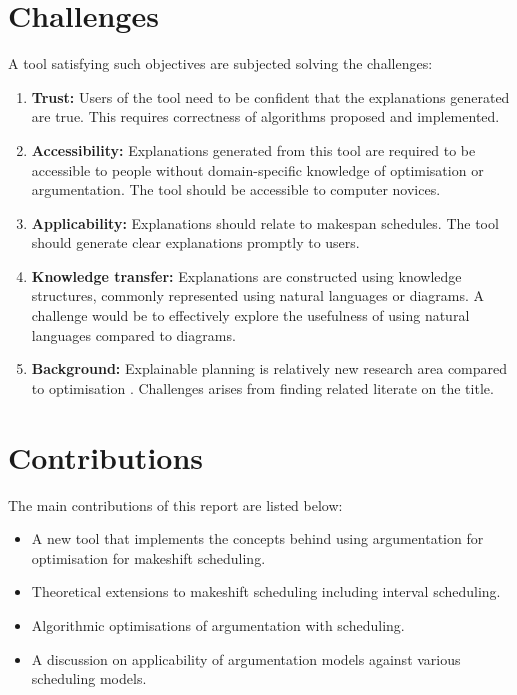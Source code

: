 \section{Challenges}

A tool satisfying such objectives are subjected solving the challenges:
\begin{enumerate}
	\item\textbf{Trust:} Users of the tool need to be confident that the explanations generated are true. This requires correctness of algorithms proposed and implemented.
	\item\textbf{Accessibility:} Explanations generated from this tool are required to be accessible to people without domain-specific knowledge of optimisation or argumentation. The tool should be accessible to computer novices.
	\item\textbf{Applicability:} Explanations should relate to makespan schedules. The tool should generate clear explanations promptly to users.
	\item\textbf{Knowledge transfer:} Explanations are constructed using knowledge structures, commonly represented using natural languages or diagrams. A challenge would be to effectively explore the usefulness of using natural languages compared to diagrams.
	\item\textbf{Background:} Explainable planning is relatively new research area compared to optimisation \cite{pe}. Challenges arises from finding related literate on the title.
\end{enumerate}

\section{Contributions}

The main contributions of this report are listed below:
\begin{itemize}
	\item A new tool \emph{\toolname} that implements the concepts behind using argumentation for optimisation for makeshift scheduling.
	\item Theoretical extensions to makeshift scheduling including interval scheduling.
	\item Algorithmic optimisations of argumentation with scheduling.
	\item A discussion on applicability of argumentation models against various scheduling models.
\end{itemize}
